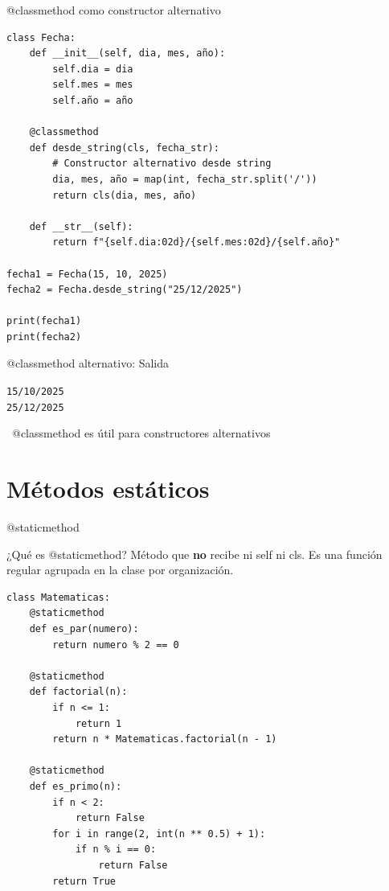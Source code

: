 \documentclass{beamer}
\begin{document}
\begin{frame}[fragile]{@classmethod como constructor alternativo \faWrench}
\begin{lstlisting}
class Fecha:
    def __init__(self, dia, mes, año):
        self.dia = dia
        self.mes = mes
        self.año = año
    
    @classmethod
    def desde_string(cls, fecha_str):
        # Constructor alternativo desde string
        dia, mes, año = map(int, fecha_str.split('/'))
        return cls(dia, mes, año)
    
    def __str__(self):
        return f"{self.dia:02d}/{self.mes:02d}/{self.año}"

fecha1 = Fecha(15, 10, 2025)
fecha2 = Fecha.desde_string("25/12/2025")

print(fecha1)
print(fecha2)
\end{lstlisting}
\end{frame}

\begin{frame}[fragile]{@classmethod alternativo: Salida \faArrowCircleRight}
\begin{tcolorbox}[colback=green!10,colframe=green,title={\small\faArrowCircleRight \ Salida},coltitle=fg0,left=3pt,right=3pt,top=3pt,bottom=3pt,boxsep=2pt]
\small\texttt{15/10/2025\\
25/12/2025}
\end{tcolorbox}

\vspace{0.3cm}
\begin{notebox}
\small\faLightbulb\ @classmethod es útil para constructores alternativos
\end{notebox}
\end{frame}

\section{Métodos estáticos}

\begin{frame}[fragile]{@staticmethod \faTools}
\begin{conceptbox}{¿Qué es @staticmethod?}
Método que \textbf{no} recibe ni self ni cls. Es una función regular agrupada en la clase por organización.
\end{conceptbox}

\begin{lstlisting}
class Matematicas:
    @staticmethod
    def es_par(numero):
        return numero % 2 == 0
    
    @staticmethod
    def factorial(n):
        if n <= 1:
            return 1
        return n * Matematicas.factorial(n - 1)
    
    @staticmethod
    def es_primo(n):
        if n < 2:
            return False
        for i in range(2, int(n ** 0.5) + 1):
            if n % i == 0:
                return False
        return True
\end{lstlisting}
\end{frame}
\end{document}
